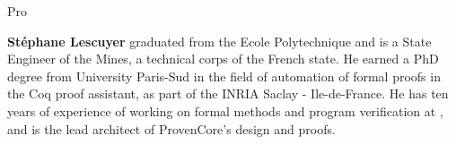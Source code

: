 \begin{sitedescription}{Pro}
\begin{compactitem}
\item {\bf Stéphane Lescuyer} graduated from the Ecole
  Polytechnique and is a State Engineer of the Mines, a technical
  corps of the French state. He earned a PhD degree from University
  Paris-Sud in the field of automation of formal proofs in the Coq
  proof assistant, as part of the INRIA Saclay - Ile-de-France. He
  has ten years of experience of working on formal methods and
  program verification at \provenrun, and is the lead architect
  of ProvenCore's design and proofs.
\end{compactitem}

\end{sitedescription}

